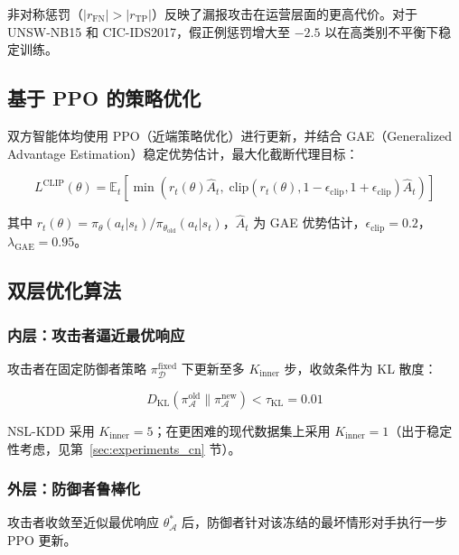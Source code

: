 \documentclass[12pt,a4paper]{ctexart}
\begin{document}
非对称惩罚（$|r_{\text{FN}}| > |r_{\text{TP}}|$）反映了漏报攻击在运营层面的更高代价。对于 UNSW-NB15 和 CIC-IDS2017，假正例惩罚增大至 $-2.5$ 以在高类别不平衡下稳定训练。

\subsection{基于 PPO 的策略优化}

双方智能体均使用 PPO（近端策略优化）进行更新\cite{schulman2017ppo}，并结合 GAE（Generalized Advantage Estimation）稳定优势估计\cite{schulman2015gae}，最大化截断代理目标：

\begin{equation}
L^{\text{CLIP}}(\theta)=
\mathbb{E}_t
\left[
\min\left(
r_t(\theta)\hat{A}_t,\;
\text{clip}(r_t(\theta),1-\epsilon_{\text{clip}},1+\epsilon_{\text{clip}})\hat{A}_t
\right)
\right]
\end{equation}

其中 $r_t(\theta) = \pi_\theta(a_t|s_t)/\pi_{\theta_{\text{old}}}(a_t|s_t)$，$\hat{A}_t$ 为 GAE 优势估计，$\epsilon_{\text{clip}} = 0.2$，$\lambda_{\text{GAE}} = 0.95$。

\subsection{双层优化算法}

\subsubsection{内层：攻击者逼近最优响应}

攻击者在固定防御者策略 $\pi_{\mathcal{D}}^{\text{fixed}}$ 下更新至多 $K_{\text{inner}}$ 步，收敛条件为 KL 散度：

\begin{equation}
D_{\text{KL}}\left(\pi_{\mathcal{A}}^{\text{old}}\|\pi_{\mathcal{A}}^{\text{new}}\right) < \tau_{\text{KL}} = 0.01
\end{equation}

NSL-KDD 采用 $K_{\text{inner}}=5$；在更困难的现代数据集上采用 $K_{\text{inner}}=1$（出于稳定性考虑，见第~\ref{sec:experiments_cn} 节）。

\subsubsection{外层：防御者鲁棒化}

攻击者收敛至近似最优响应 $\theta_{\mathcal{A}}^*$ 后，防御者针对该冻结的最坏情形对手执行一步 PPO 更新。
\end{document}

